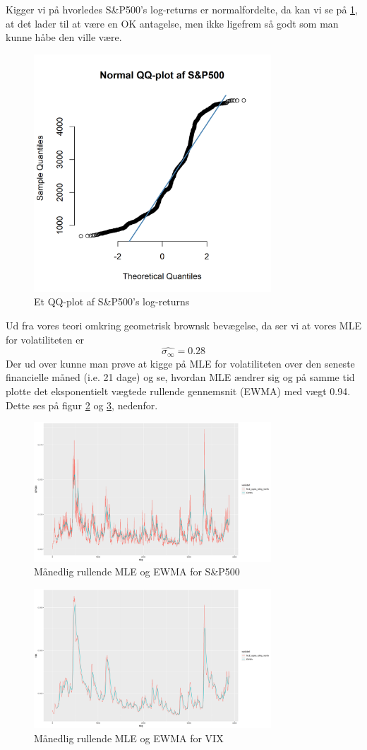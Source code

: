\documentclass{article}
\theoremstyle{definition}
\theoremstyle{remark}
\begin{document}
\color{red}Kigger vi på hvorledes S\&P500's log-returns er normalfordelte, da kan vi se på \ref{fig:QQSP500}, at det lader til at være en OK antagelse, men ikke ligefrem så godt som man kunne håbe den ville være.\color{black}
\begin{figure}
    \centering
    \includegraphics[width=3.5in]{SP500_QQplot.png}
    \caption{\color{red}Et QQ-plot af S\&P500's log-returns\color{black}}
    \label{fig:QQSP500}
\end{figure}
Ud fra vores teori omkring geometrisk brownsk bevægelse, da ser vi at vores MLE for volatiliteten er
$$\hat{\sigma_{\infty}}=0.28$$
Der ud over kunne man prøve at kigge på MLE for volatiliteten over den seneste financielle måned (i.e. 21 dage) og se, hvordan MLE ændrer sig og på samme tid plotte det eksponentielt vægtede rullende gennemsnit (EWMA) med vægt 0.94. Dette ses på figur \ref{fig:EWMA} og \ref{fig:EWMA_VIX}, nedenfor. 
\begin{figure}
    \centering
    \includegraphics[width=3.5in]{SP500_rolling_volatility.png}
    \caption{Månedlig rullende MLE og EWMA for S\&P500}
    \label{fig:EWMA}
\end{figure}
\begin{figure}
    \centering
    \includegraphics[width=3.5in]{VIX_rolling_volatility.png}
    \caption{Månedlig rullende MLE og EWMA for VIX}
    \label{fig:EWMA_VIX}
\end{figure}
\end{document}
